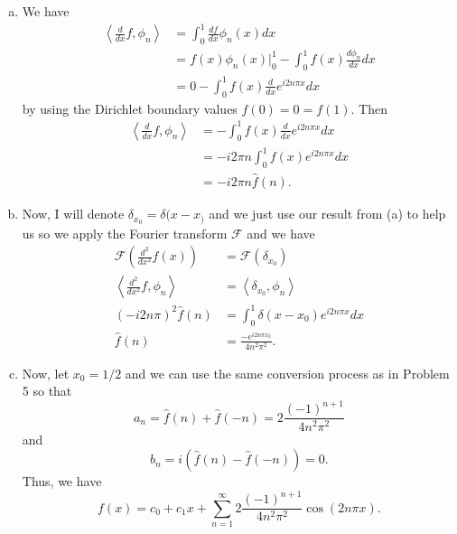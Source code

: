 \documentclass[12pt]{article} %
\newcommand{\innprod}[2]{\left\langle #1, #2\right\rangle}
\begin{document}
\begin{solution}
\begin{enumerate}[(a)]
\item We have
\begin{align*}
\left\langle \frac{d}{dx} f , \phi_n \right\rangle &= \int_0^1 \frac{df}{dx} \phi_n(x) dx \\
&= f(x)\phi_n(x) \vert_0^1 - \int_0^1 f(x) \frac{d \phi_n}{dx} dx\\
&= 0 - \int_0^1 f(x) \frac{d}{dx} e^{i2n \pi x} dx
\end{align*}
by using the Dirichlet boundary values $f(0)=0=f(1)$. Then
\begin{align*}
\left\langle \frac{d}{dx} f , \phi_n \right\rangle &= -\int_0^1 f(x) \frac{d}{dx} e^{i2n \pi x} dx\\
&= -i2\pi n \int_0^1 f(x) e^{i2 n \pi x}dx\\
&= -i2 \pi n \hat{f}(n).
\end{align*}
\item Now, I will denote $\delta_{x_0}=\delta(x-x_)$ and we just use our result from (a) to help us so we apply the Fourier transform $\mathcal{F}$ and we have
\begin{align*}
\mathcal{F}\left( \frac{d^2}{dx^2} f(x)\right) &= \mathcal{F}(\delta_{x_0})\\
\innprod{\frac{d^2}{dx^2} f}{\phi_n} &= \innprod{\delta_{x_0}}{\phi_n}\\
(-i2n \pi)^2 \hat{f}(n)&=\int_0^1 \delta(x-x_0) e^{i2n\pi x}dx\\
\hat{f}(n) &= \frac{-e^{i2n \pi x_0}}{4n^2 \pi^2} .
\end{align*}
\item Now, let $x_0=1/2$ and we can use the same conversion process as in Problem 5 so that
\[
a_n  = \hat{f}(n) + \hat{f}(-n) = 2\frac{(-1)^{n+1}}{4n^2 \pi^2}
\]
and
\[
b_n = i(\hat{f}(n) - \hat{f}(-n)) = 0.
\]
Thus, we have
\[
f(x) = c_0 + c_1 x + \sum_{n=1}^\infty 2 \frac{(-1)^{n+1}}{4n^2 \pi^2} \cos(2n\pi x).
\]


\end{enumerate}
\end{solution}
\end{document}
